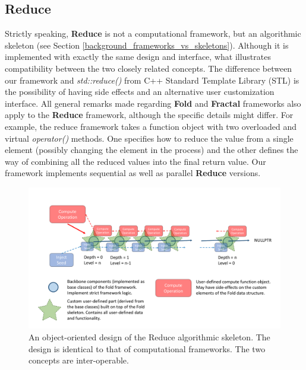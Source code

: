 \subsection{Reduce}
\label{frameworks_reduce}
\quad Strictly speaking, \textbf{Reduce} is not a computational framework, but an algorithmic skeleton (see Section \ref{background_frameworks_vs_skeletons}). Although it is implemented with exactly the same design and interface, what illustrates compatibility between the two closely related concepts. The difference between our framework and \textit{std::reduce()} from C++ Standard Template Library (STL) is the possibility of having side effects and an alternative user customization interface. All general remarks made regarding \textbf{Fold} and \textbf{Fractal} frameworks also apply to the \textbf{Reduce} framework, although the specific details might differ. For example, the reduce framework takes a function object with two overloaded and virtual \textit{operator()} methods. One specifies how to reduce the value from a single element (possibly changing the element in the process) and the other defines the way of combining all the reduced values into the final return value. Our framework implements sequential as well as parallel \textbf{Reduce} versions.
\begin{figure}[ht]
\includegraphics[width=1.0\textwidth]{images/Fold.pdf}
\caption{An object-oriented design of the Reduce algorithmic skeleton. The design is identical to that of computational frameworks. The two concepts are inter-operable.}
\label{fig:reduce}
\end{figure}
